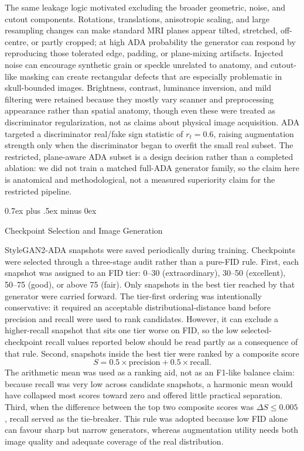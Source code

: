 \documentclass[conference,twoside]{IEEEtran}
\makeatletter
\newcommand{\bodyfont}{\rmfamily}
\def\subsection{\@startsection{subsection}{2}{\z@}{1.5ex plus 1.5ex minus 0.5ex}%
{0.7ex plus .5ex minus 0ex}{\normalfont\normalsize\bodyfont\bfseries\raggedright}}
\makeatother
\begin{document}
The same leakage logic motivated excluding the broader geometric, noise, and cutout components. Rotations, translations, anisotropic scaling, and large resampling changes can make standard MRI planes appear tilted, stretched, off-centre, or partly cropped; at high ADA probability the generator can respond by reproducing those tolerated edge, padding, or plane-mixing artifacts. Injected noise can encourage synthetic grain or speckle unrelated to anatomy, and cutout-like masking can create rectangular defects that are especially problematic in skull-bounded images. Brightness, contrast, luminance inversion, and mild filtering were retained because they mostly vary scanner and preprocessing appearance rather than spatial anatomy, though even these were treated as discriminator regularization, not as claims about physical image acquisition. ADA targeted a discriminator real/fake sign statistic of $r_t=0.6$, raising augmentation strength only when the discriminator began to overfit the small real subset. The restricted, plane-aware ADA subset is a design decision rather than a completed ablation: we did not train a matched full-ADA generator family, so the claim here is anatomical and methodological, not a measured superiority claim for the restricted pipeline.

\subsection{Checkpoint Selection and Image Generation}

StyleGAN2-ADA snapshots were saved periodically during training. Checkpoints were selected through a three-stage audit rather than a pure-FID rule. First, each snapshot was assigned to an FID tier: 0--30 (extraordinary), 30--50 (excellent), 50--75 (good), or above 75 (fair). Only snapshots in the best tier reached by that generator were carried forward. The tier-first ordering was intentionally conservative: it required an acceptable distributional-distance band before precision and recall were used to rank candidates. However, it can exclude a higher-recall snapshot that sits one tier worse on FID, so the low selected-checkpoint recall values reported below should be read partly as a consequence of that rule. Second, snapshots inside the best tier were ranked by a composite score
\begin{equation}
  S = 0.5 \times \text{precision} + 0.5 \times \text{recall}.
\end{equation} The arithmetic mean was used as a ranking aid, not as an F1-like balance claim: because recall was very low across candidate snapshots, a harmonic mean would have collapsed most scores toward zero and offered little practical separation. Third, when the difference between the top two composite scores was $\Delta S \leq 0.005$, recall served as the tie-breaker. This rule was adopted because low FID alone can favour sharp but narrow generators, whereas augmentation utility needs both image quality and adequate coverage of the real distribution.
\end{document}
